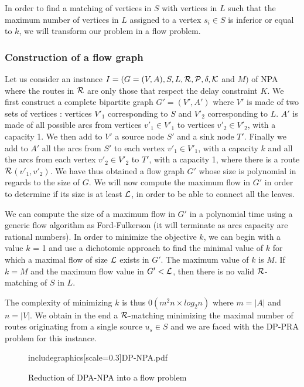 \documentclass{article}
\newcommand\rmatching{$\cal R$-matching\xspace}
\begin{document}
In order to find a matching of vertices in $S$ with vertices in $L$ such that the maximum number of vertices in $L$ assigned to a vertex $s_i \in S$ is inferior or equal to $k$, we will transform our problem in a flow problem.

\subsubsection{Construction of a flow graph}

Let us consider an instance $I= (G=(V,A), S, L, \cal R, P, \delta, K$ and $M)$ of NPA where the routes in $\cal R$ are only those that respect the delay constraint $K$. We first construct a complete bipartite graph $G'=(V',A')$ where $V'$ is made of two sets of vertices : vertices $V'_1$ corresponding to $S$ and $V'_2$ corresponding to $ L$. $A'$ is made of all possible arcs from vertices $v'_1 \in V'_1$ to vertices $v'_2 \in V'_2$, with a capacity 1. We then add to $V'$ a source node $S'$ and a sink node $T'$. Finally we add to $A'$ all the arcs from $S'$ to each vertex $v'_1 \in V'_1$, with a capacity $k$  and all the arcs from each vertex $v'_2 \in V'_2$ to $T'$, with a capacity 1, where there is a route $\cal R$$(v'_1, v'_2)$. We have thus obtained a flow graph $G'$ whose size is polynomial in regards to the size of $G$. We will now compute the maximum flow in $G'$ in order to determine if its size is at least $\cal L$, in order to be able to connect all the leaves.

We can compute the size of a maximum flow in $G'$ in a polynomial time using a generic flow algorithm as Ford-Fulkerson (it will terminate as arcs capacity are rational numbers). In order to minimize the objective $k$, we can begin with a value $k$ = 1 and use a dichotomic approach to find the minimal value of $k$ for which a maximal flow of size $\cal L$ exists in $G'$. The maximum value of $k$ is $M$. If $k = M$ and the maximum flow value in $G' < \cal L$, then there is no valid \rmatching of $S$ in $L$.

The complexity of minimizing $k$ is thus $0(m^2n \times log_2 n)$ where $m = |A|$ and $n=|V|$. We obtain in the end a \rmatching minimizing the maximal number of routes originating from a single source $u_s \in S$ and we are faced with the DP-PRA problem for this instance.


\begin{figure}[!t]
\centering
includegraphics[scale=0.3]{DP-NPA.pdf}
\caption{Reduction of DPA-NPA into a flow problem}
\label{Modelling of DP-NPA Problem}
\end{figure}
\end{document}
